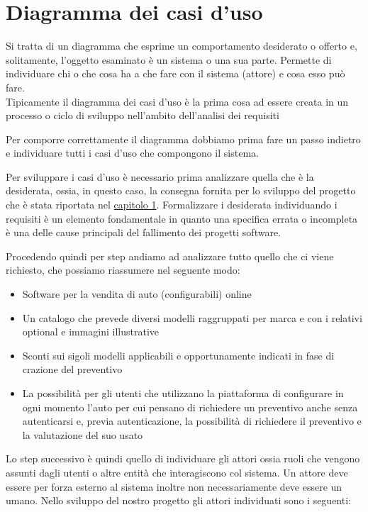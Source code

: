 \documentclass[a4paper, 11pt,oneside,]{book}
\newcommand{\spacing}{\par\bigskip\noindent}
\begin{document}
    \section{Diagramma dei casi d'uso}
        Si tratta di un diagramma che esprime un comportamento desiderato o offerto e, solitamente, l'oggetto esaminato è un sistema o una sua parte. Permette di individuare chi o che cosa ha a che fare con il sistema (attore) e cosa
        esso può fare.\\
        Tipicamente il diagramma dei casi d'uso è la prima cosa ad essere creata in un processo o ciclo di sviluppo nell'ambito dell'analisi dei requisiti
        \spacing
        Per comporre correttamente il diagramma dobbiamo prima fare un passo indietro e individuare tutti i casi d'uso che compongono il sistema.
        \spacing
        Per sviluppare i casi d'uso è necessario prima analizzare quella che è la desiderata, ossia, in questo caso, la consegna fornita per lo sviluppo del progetto che è stata riportata nel \hyperlink{chapter.1}{capitolo 1}. Formalizzare i desiderata
        individuando i requisiti è un elemento fondamentale in quanto una specifica errata o incompleta è una delle cause principali del fallimento dei progetti software.
        \spacing
        Procedendo quindi per step andiamo ad analizzare tutto quello che ci viene richiesto, che possiamo riassumere nel seguente modo:
        \begin{itemize}
            \item Software per la vendita di auto (configurabili) online
            \item Un catalogo che prevede diversi modelli raggruppati per marca e con i relativi optional e immagini illustrative
            \item Sconti sui sigoli modelli applicabili e opportunamente indicati in fase di crazione del preventivo
            \item La possibilità per gli utenti che utilizzano la piattaforma di configurare in ogni momento l'auto per cui pensano di richiedere un preventivo anche senza autenticarsi e, previa autenticazione, la possibilità
            di richiedere il preventivo e la valutazione del suo usato
        \end{itemize}
        Lo step successivo è quindi quello di individuare gli attori ossia ruoli che vengono assunti dagli utenti o altre entità che interagiscono col sistema. Un attore deve essere per forza esterno al sistema inoltre non necessariamente deve essere un
        umano. Nello sviluppo del nostro progetto gli attori individuati sono i seguenti:
\end{document}
